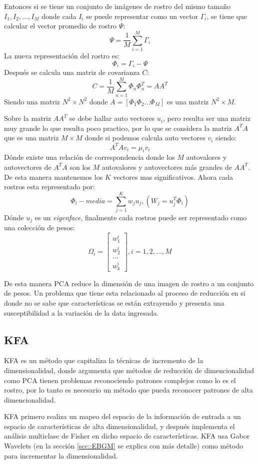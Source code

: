 Entonces si se tiene un conjunto de imágenes de rostro del mismo tamaño ${I_1,I_2,...,I_M}$ donde cada $I_i$ se puede representar como un vector $\Gamma_i$, se tiene que calcular el vector promedio de rostro $\Psi$:
\[\Psi =\frac{1}{M}\sum^M_{i=1}\Gamma_i\] 
La nueva representación del rostro es: 
\[\Phi_i=\Gamma_i-\Psi\]
Después se calcula una matriz de covarianza $C$:
\[C=\frac{1}{M}\sum^M_{n=1}\Phi_n \Phi^T_n=AA^T \]
Siendo una matriz $N^2\times N^2$ donde $A=[\Phi_1\Phi_2...\Phi_M]$ es una matriz $N^2\times M$.

Sobre la matriz $AA^T$ se debe hallar auto vectores $u_i$, pero resulta ser una matriz muy grande lo que resulta poco practico, por lo que se considera la matriz $A^TA$ que es una matriz $M\times M$ donde si podemos calcula auto vectores $v_i$ siendo: 
\[A^TAv_i=\mu_iv_i\]
Dónde existe una relación de correspondencia donde los $M$ autovalores y autovectores de $A^TA$ son los $M$ autovalores y autovectores más grandes de $AA^T$. De esta manera mantenemos los $K$ vectores mas significativos. Ahora cada rostros esta representado por: 
\[\Phi_i-media= \sum^{K}_{j=1} w_j u_j, (W_j=u^T_j\Phi_i)\]
Dónde $u_j$ es un \textit{eigenface}, finalmente cada rostros puede ser representado como una colección de pesos:
\[\Omega_i=\begin{bmatrix}
w^i_1\\ 
w^i_2\\ 
...\\ 
w^i_k
\end{bmatrix} , i=1,2,...,M\]

De esta manera \ac{PCA} reduce la dimensión de una imagen de rostro a un conjunto de pesos. Un problema que tiene esta relacionado al proceso de reducción en si donde no se sabe que características se están extrayendo y presenta una susceptibilidad a la variación de la data ingresada.

\subsection{\ac{KFA}}
\ac{KFA} \cite{liu2006capitalize} es un método que capitaliza la técnicas de incremento de la dimensionalidad, donde argumenta que métodos de reducción de dimencionalidad como \ac{PCA} tienen problemas reconociendo patrones complejos como lo es el rostro, por lo tanto es necesario un método que pueda reconocer patrones de alta dimencionalidad.

\ac{KFA} primero realiza un mapeo del espacio de la información de entrada a un espacio de características de alta dimensionalidad, y después implementa el análisis multiclase de Fisher en dicho espacio de características. \ac{KFA} usa Gabor Wavelets (en la sección \ref{scc::EBGM} se explica con más detalle) como método para incrementar la dimensionalidad.

